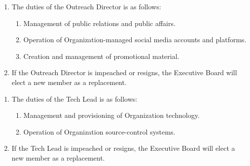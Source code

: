 \begin{enumerate}
	\item The duties of the Outreach Director is as follows:
		\begin{enumerate}
			\item Management of public relations and public affairs.

			\item Operation of Organization-managed social media accounts and platforms.

			\item Creation and management of promotional material.
		\end{enumerate}

	\item If the Outreach Director is impeached or resigns, the Executive Board
		will elect a new member as a replacement.
\end{enumerate}

\begin{enumerate}
	\item The duties of the Tech Lead is as follows:
		\begin{enumerate}
			\item Management and provisioning of Organization technology.

			\item Operation of Organization source-control systems.
		\end{enumerate}

	\item If the Tech Lead is impeached or resigns, the Executive Board will elect
		a new member as a replacement.
\end{enumerate}